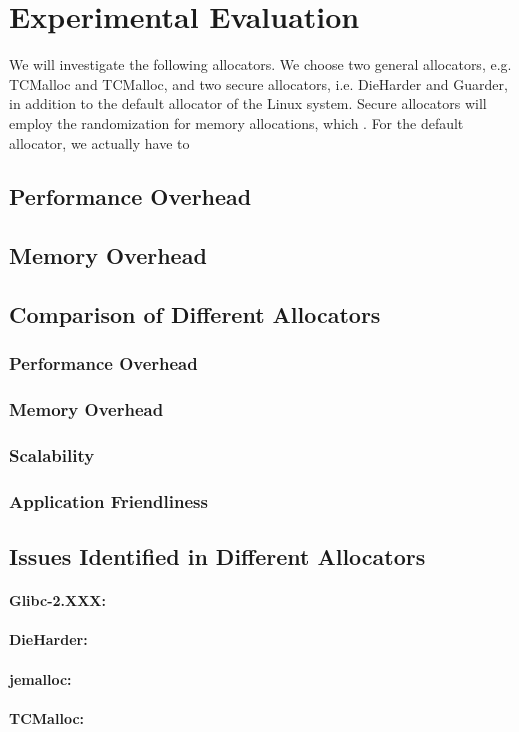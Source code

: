 \section{Experimental Evaluation}
\label{sec:evaluation}

We will investigate the following allocators. We choose two general allocators, e.g. TCMalloc and TCMalloc, and two secure allocators, i.e. DieHarder and Guarder, in addition to the default allocator of the Linux system. Secure allocators will employ the randomization for memory allocations, which . 
For the default allocator, we actually have to 

\subsection{Performance Overhead}



\subsection{Memory Overhead}

\subsection{Comparison of Different Allocators}

\subsubsection{Performance Overhead}

\subsubsection{Memory Overhead}

\subsubsection{Scalability}

\subsubsection{Application Friendliness}


\subsection{Issues Identified in Different Allocators}

\paragraph{Glibc-2.XXX:}

\paragraph{DieHarder:}

\paragraph{jemalloc:}

\paragraph{TCMalloc:}
